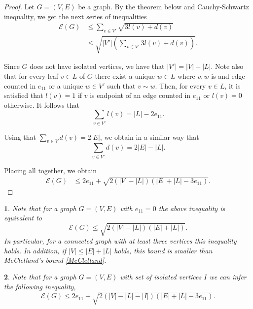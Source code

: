 \documentclass[a4paper]{article}
\newcommand{\abs}[1]{\left\lvert#1\right\rvert}
\newcommand{\energy}[1]{\mathcal{E}\left(#1\right)}
\theoremstyle{plain}
\newtheorem{remark}{\protect\rename}
\renewcommand{\rename}{Remark}%
\begin{document}
\begin{proof}
    Let \(G = (V,E)\) be a graph. By the theorem below and Cauchy-Schwartz inequality, we get the next series of inequalities
    \begin{align*}
        \energy G &\leq \sum_{v \in V'} \sqrt{3l(v) + d(v)}\\
        &\leq \sqrt{\abs{V'}\left(\sum_{v \in V'} 3l(v) + d(v)\right)}.
    \end{align*}

    Since $G$ does not have isolated vertices, we have that \(\abs{V'} = \abs{V} - \abs{L}\). Note also that for every leaf \(v \in L\) of \(G\) there exist a unique \(w \in L\) where \(v,w\) is and edge counted in \(e_{11}\) or a unique \(w \in V'\) such that \(v \sim w\). Then, for every $v \in L$, it is satisfied that \(l(v) = 1\) if \(v\) is endpoint of an edge counted in \(e_{11}\) or \(l(v) = 0\) otherwise. It follows that
    \[
        \sum_{v \in V'} l(v) =  \abs{L} - 2e_{11}.
    \]

    Using that \(\sum_{v \in V} d(v) = 2\abs{E}\), we obtain in a similar way that
    \[
        \sum_{v \in V'} d(v) = 2\abs{E} - \abs{L}.
    \]

    Placing all together, we obtain
    \begin{align*}
        \energy G &\leq 2e_{11} + \sqrt{2(\abs{V} - \abs{L})(\abs{E} + \abs{L} - 3e_{11})}.
    \end{align*}
    
\end{proof}

\begin{remark}
    Note that for a graph \(G = (V,E)\) with \(e_{11} = 0\) the above inequality is equivalent to
    \[
        \energy G \leq \sqrt{2(\abs{V} - \abs{L})(\abs{E} + \abs{L})}.
    \]
    In particular, for a connected graph with at least three vertices this inequality holds. In addition, if \(\abs{V} \leq \abs{E} + \abs{L}\) holds, this bound is smaller than McClelland's bound \eqref{McClelland}.
    
\end{remark}

\begin{remark}
    Note that for a graph \(G = (V,E)\) with set of isolated vertices \(I\) we can infer the following inequality,
    \[
        \energy G \leq 2 e_{11} + \sqrt{2(\abs{V} - \abs{L} - \abs{I})(\abs{E} + \abs{L} - 3 e_{11})}.
    \]
    
\end{remark}
\end{document}
